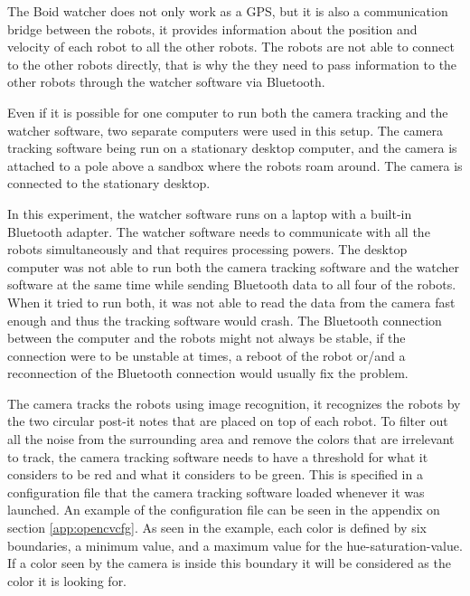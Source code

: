 The Boid watcher does not only work as a GPS, but it is also a communication bridge between the robots, it provides information about the position and velocity of each robot to all the other robots. The robots are not able to connect to the other robots directly, that is why the they need to pass information to the other robots through the watcher software via Bluetooth.

Even if it is possible for one computer to run both the camera tracking and the watcher software, two separate computers were used in this setup. The camera tracking software being run on a stationary desktop computer, and the camera is attached to a pole above a sandbox where the robots roam around. The camera is connected to the stationary desktop. 

In this experiment, the watcher software runs on a laptop with a built-in Bluetooth adapter. The watcher software needs to communicate with all the robots simultaneously and that requires processing powers.
The desktop computer was not able to run both the camera tracking software and the watcher software at the same time while sending Bluetooth data to all four of the robots. When it tried to run both, it was not able to read the data from the camera fast enough and thus the tracking software would crash. The Bluetooth connection between the computer and the robots might not always be stable, if the connection were to be unstable at times, a reboot of the robot or/and a reconnection of the Bluetooth connection would usually fix the problem.

The camera tracks the robots using image recognition, it recognizes the robots by the two circular post-it notes that are placed on top of each robot. 
To filter out all the noise from the surrounding area and remove the colors that are irrelevant to track, the camera tracking software needs to have a threshold for what it considers to be red and what it considers to be green. This is specified in a configuration file that the camera tracking software loaded whenever it was launched. An example of the configuration file can be seen in the appendix on section \ref{app:opencvcfg}. As seen in the example, each color is defined by six boundaries, a minimum value, and a maximum value for the hue-saturation-value. If a color seen by the camera is inside this boundary it will be considered as the color it is looking for.\clearpage

